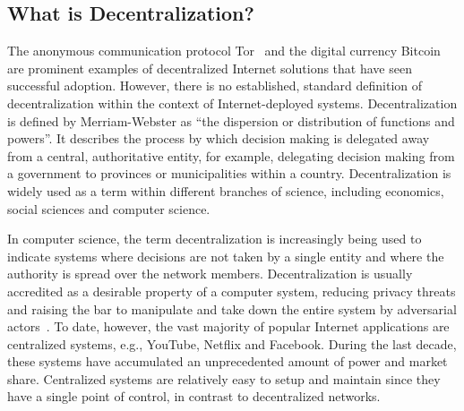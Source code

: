 \subsection{What is Decentralization?}
The anonymous communication protocol Tor~\cite{syverson2004tor} and the digital currency Bitcoin~\cite{nakamoto2008bitcoin} are prominent examples of decentralized Internet solutions that have seen successful adoption.
However, there is no established, standard definition of decentralization within the context of Internet-deployed systems.
Decentralization is defined by Merriam-Webster as \enquote{the dispersion or distribution of functions and powers}.
It describes the process by which decision making is delegated away from a central, authoritative entity, for example, delegating decision making from a government to provinces or municipalities within a country.
Decentralization is widely used as a term within different branches of science, including economics, social sciences and computer science.

In computer science, the term decentralization is increasingly being used to indicate systems where decisions are not taken by a single entity and where the authority is spread over the network members.
Decentralization is usually accredited as a desirable property of a computer system, reducing privacy threats and raising the bar to manipulate and take down the entire system by adversarial actors~\cite{troncoso2017systematizing}.
To date, however, the vast majority of popular Internet applications are centralized systems, e.g., YouTube, Netflix and Facebook.
During the last decade, these systems have accumulated an unprecedented amount of power and market share.
Centralized systems are relatively easy to setup and maintain since they have a single point of control, in contrast to decentralized networks.

